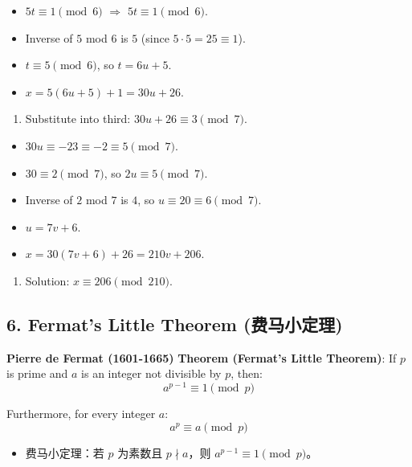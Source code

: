 \documentclass[10pt,a4paper,openany]{ctexbook}
\theoremstyle{definition}
\theoremstyle{remark}
\begin{document}
\begin{itemize}
\item $5t \equiv 1 \pmod{6}$ $\Rightarrow$ $5t \equiv 1 \pmod{6}$.
\item Inverse of $5$ mod $6$ is $5$ (since $5 \cdot 5 = 25 \equiv 1$).
\item $t \equiv 5 \pmod{6}$, so $t = 6u + 5$.
\item $x = 5(6u + 5) + 1 = 30u + 26$.
\end{itemize}

\begin{enumerate}
\item Substitute into third: $30u + 26 \equiv 3 \pmod{7}$.
\end{enumerate}

\begin{itemize}
\item $30u \equiv -23 \equiv -2 \equiv 5 \pmod{7}$.
\item $30 \equiv 2 \pmod{7}$, so $2u \equiv 5 \pmod{7}$.
\item Inverse of $2$ mod $7$ is $4$, so $u \equiv 20 \equiv 6 \pmod{7}$.
\item $u = 7v + 6$.
\item $x = 30(7v + 6) + 26 = 210v + 206$.
\end{itemize}

\begin{enumerate}
\item Solution: $x \equiv 206 \pmod{210}$.

\end{enumerate}

\vspace{-2pt}

\subsection{6. Fermat's Little Theorem (费马小定理)}

\textbf{Pierre de Fermat (1601-1665)}
\textbf{Theorem (Fermat's Little Theorem)}: If $p$ is prime and $a$ is an integer not divisible by $p$, then:
\[
a^{p-1} \equiv 1 \pmod{p}
\]

Furthermore, for every integer $a$:
\[
a^p \equiv a \pmod{p}
\]

\begin{itemize}
\item 费马小定理：若 $p$ 为素数且 $p \nmid a$，则 $a^{p-1} \equiv 1 \pmod{p}$。

\end{itemize}
\end{document}
